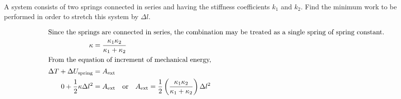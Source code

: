 \item A system consists of two springs connected in series and having the stiffness coefficients $k_1$ and $k_2$. Find the minimum work to be performed in order to stretch this system by $\Delta l$.
\begin{solution}
    \begin{center}
    \end{center}
    
    \begin{align*}
        \intertext{Since the springs are connected in series, the combination may be treated as a single spring of spring constant.}
        \kappa &= \dfrac{\kappa_1 \kappa_2}{\kappa_1 + \kappa_2}\\
        \intertext{From the equation of increment of mechanical energy,}
        \Delta T + \Delta U_{\text{spring}} &= A_{\text{ext}}\\
        0 + \dfrac{1}{2} \kappa \Delta l^2 &= A_{\text{ext}} \quad \text{or} \quad A_{\text{ext}} = \dfrac{1}{2} \left( \dfrac{\kappa_1 \kappa_2}{\kappa_1 + \kappa_2} \right) \Delta l^2
    \end{align*}
\end{solution}

